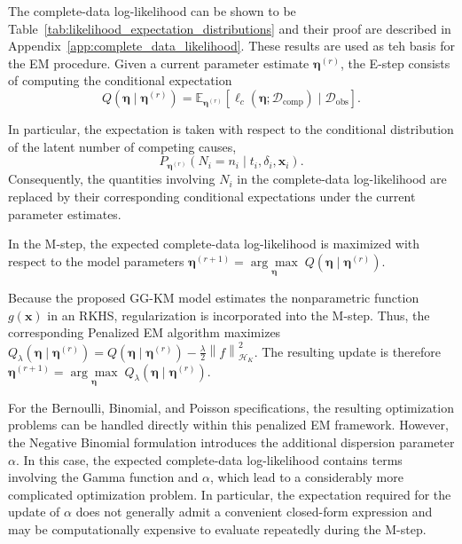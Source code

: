 The complete-data log-likelihood can be shown to be Table~\ref{tab:likelihood_expectation_distributions}
and their proof are described in Appendix~\ref{app:complete_data_likelihood}. These
results are used as teh basis for the EM procedure. Given a current
parameter estimate $\boldsymbol{\eta}^{(r)}$, the E-step consists of
computing the conditional expectation
\begin{equation}
Q\left(
\boldsymbol{\eta}\mid\boldsymbol{\eta}^{(r)}
\right)
=
\mathbb{E}_{\boldsymbol{\eta}^{(r)}}
\left[
\ell_c
\left(
\boldsymbol{\eta};
\mathcal{D}_{\mathrm{comp}}
\right)
\mid
\mathcal{D}_{\mathrm{obs}}
\right].
\label{eq:generic_Q_function}
\end{equation}

In particular, the expectation is taken with respect to the conditional
distribution of the latent number of competing causes,
\[
P_{\boldsymbol{\eta}^{(r)}}
\left(
N_i=n_i
\mid
t_i,\delta_i,\mathbf{x}_i
\right).
\]
Consequently, the quantities involving $N_i$ in the complete-data
log-likelihood are replaced by their corresponding conditional
expectations under the current parameter estimates.

In the M-step, the expected complete-data log-likelihood is maximized
with respect to the model parameters
$\boldsymbol{\eta}^{(r+1)}
=
\underset{\boldsymbol{\eta}}{\arg\max}
\;
Q\left(
\boldsymbol{\eta}\mid\boldsymbol{\eta}^{(r)}
\right)$.

Because the proposed GG-KM model estimates the nonparametric function
$g(\mathbf{x})$ in an RKHS, regularization is incorporated into the
M-step. Thus, the corresponding Penalized EM algorithm maximizes
$Q_{\lambda}\left(\boldsymbol{\eta}\mid\boldsymbol{\eta}^{(r)}\right) = Q\left( \boldsymbol{\eta}\mid\boldsymbol{\eta}^{(r)} \right) - \frac{\lambda}{2} \left\|f\right\|_{\mathcal{H}_K}^{2}$.
The resulting update is therefore $\boldsymbol{\eta}^{(r+1)} = \underset{\boldsymbol{\eta}}{\arg\max} \; Q_{\lambda} \left( \boldsymbol{\eta}\mid\boldsymbol{\eta}^{(r)}\right)$.

For the Bernoulli, Binomial, and Poisson specifications, the resulting
optimization problems can be handled directly within this penalized EM
framework. However, the Negative Binomial formulation introduces the
additional dispersion parameter $\alpha$. In this case, the expected
complete-data log-likelihood contains terms involving the Gamma
function and $\alpha$, which lead to a considerably more complicated
optimization problem. In particular, the expectation required for the
update of $\alpha$ does not generally admit a convenient closed-form
expression and may be computationally expensive to evaluate repeatedly
during the M-step.

